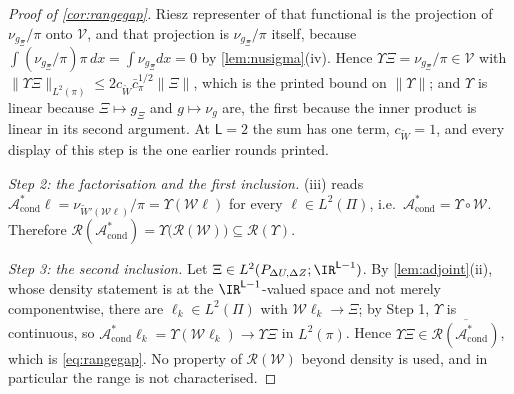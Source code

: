 \begin{proof}[Proof of \cref{cor:rangegap}]
Riesz representer of that functional is the projection of $\nu_{g_\Xi}/\pi$ onto $\mathcal V$, and
that projection is $\nu_{g_\Xi}/\pi$ itself, because $\int(\nu_{g_\Xi}/\pi)\pi\,dx=\int\nu_{g_\Xi}dx=0$
by \cref{lem:nusigma}(iv). Hence $\Upsilon\Xi=\nu_{g_\Xi}/\pi\in\mathcal V$ with
$\|\Upsilon\Xi\|_{L^{2}(\pi)}\le2c_{\widetilde W}\bar c_\pi^{1/2}\|\Xi\|$, which is the printed bound on
$\|\Upsilon\|$; and $\Upsilon$ is linear because
$\Xi\mapsto g_\Xi$ and $g\mapsto\nu_g$ are, the first because the inner product is linear in its second
argument. At $\mathsf L=2$ the sum has one term, $c_{\widetilde W}=1$, and every display of this
step is the one earlier rounds printed.

\emph{Step 2: the factorisation and the first inclusion.}
(iii) reads $\mathcal A^\ast_{\mathrm{cond}}\ell=\nu_{\widetilde W'(\mathcal W\ell)}/\pi
=\Upsilon(\mathcal W\ell)$ for every $\ell\in L^{2}(\Pi)$, i.e.\
$\mathcal A^\ast_{\mathrm{cond}}=\Upsilon\circ\mathcal W$. Therefore
$\mathcal R(\mathcal A^\ast_{\mathrm{cond}})=\Upsilon\big(\mathcal R(\mathcal W)\big)\subseteq\mathcal R(\Upsilon)$.

\emph{Step 3: the second inclusion.}
Let $\Xi\in L^{2}(P_{\Delta U,\Delta Z};\IR^{\mathsf L-1})$. By \cref{lem:adjoint}(ii), whose density
statement is at the $\IR^{\mathsf L-1}$-valued space and not merely componentwise, there are
$\ell_k\in L^{2}(\Pi)$ with
$\mathcal W\ell_k\to\Xi$; by Step 1, $\Upsilon$ is continuous, so
$\mathcal A^\ast_{\mathrm{cond}}\ell_k=\Upsilon(\mathcal W\ell_k)\to\Upsilon\Xi$ in $L^{2}(\pi)$.
Hence $\Upsilon\Xi\in\overline{\mathcal R(\mathcal A^\ast_{\mathrm{cond}})}$, which is
\eqref{eq:rangegap}. No property of $\mathcal R(\mathcal W)$ beyond density is used, and in
particular the range is not characterised.
\end{proof}

